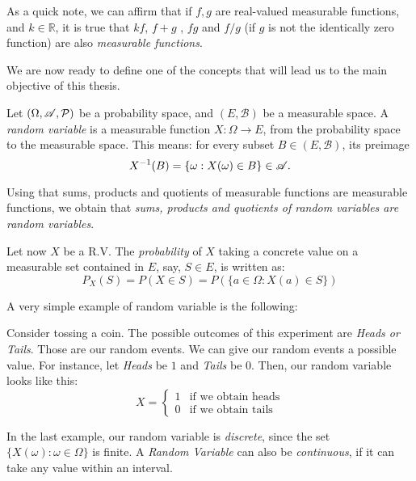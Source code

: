 As a quick note, we can affirm that if $f,g$ are real-valued measurable functions, and $k \in \mathbb R$, it is true that $kf$, $f+g$ , $fg$ and $f/g$ (if $g$ is not the identically zero function) are also \emph{measurable functions}.

We are now ready to define one of the concepts that will lead us to the main objective of this thesis.

\begin{ndef}
Let $(\Omega,\mathscr{A},\mathcal{P})$ be a probability space, and $(E,\mathcal B)$ be a measurable space. 
A \emph{random variable} is a measurable function $X: \Omega \to E$, from the probability space to the measurable space. This means: for every subset $B \in (E,\mathcal B)$, its preimage
$$
X^{-1}(B) = \{\omega : X(\omega) \in B\} \in \mathscr{A} .
$$
\end{ndef}

Using that sums, products and quotients of measurable functions are measurable functions, we obtain that \emph{sums, products and quotients of random variables are random variables}.

Let now $X$ be a R.V. The \emph{probability} of $X$ taking a concrete value on a measurable set contained in $E$, say, $S \in E$, is written as:
$$
P_X(S) = P(X \in S) = P(\{a \in \Omega : X(a) \in S\})
$$

A very simple example of random variable is the following:

\begin{nexample}
  Consider tossing a coin. The possible outcomes of this experiment are \emph{Heads or Tails}. Those are our random events. We can give our random events a possible value. For instance, let \emph{Heads} be $1$ and \emph{Tails} be 0. Then, our random variable looks like this:
  \begin{equation*}
      X  = \left\{ \begin{aligned}
  1 & \text{if we obtain heads} \\
  0 & \text{if we obtain tails}
\end{aligned}\right.
  \end{equation*}

\end{nexample}

In the last example, our random variable is \emph{discrete}, since the set $\{X(\omega): \omega \in \Omega\}$ is finite.
 A \emph{Random Variable} can also be \emph{continuous}, if it can take any value within an interval.\\



